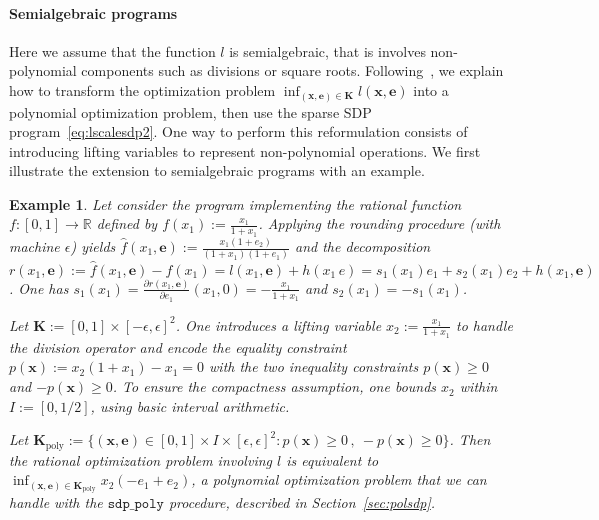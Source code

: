 \documentclass[preprint,fleqn,nocopyrightspace]{sigplanconf}
\newcommand{\R}{\mathbb{R}}
\newcommand{\x}{\mathbf{x}}
\newcommand{\e}{\mathbf{e}}
\def\K{\mathbf{K}}
\newcommand{\Kpol}{\K_{\text{poly}}}
\newcommand{\sdppoly}{\mathtt{sdp\_poly}}
\theoremstyle{plain}
\newtheorem{example}{Example}
\begin{document}
\paragraph{Semialgebraic programs}
Here we assume that the function $l$ is semialgebraic, that is involves non-polynomial components such as divisions or square roots.
Following~\cite{LasPut10}, we explain how to transform the optimization problem $\inf_{(\x,\e) \in \K} l (\x, \e)$ into a polynomial optimization problem, then use the sparse SDP program~\eqref{eq:lscalesdp2}. One way to perform this reformulation consists of introducing lifting variables to represent non-polynomial operations.
%
We first illustrate the extension to semialgebraic programs with an example.
\begin{example}
Let consider the program implementing the rational function $f : [0, 1] \to \R$ defined by $f(x_1) := \frac{x_1}{1 + x_1}$. Applying the rounding procedure (with machine $\epsilon$) yields $\hat{f}(x_1,\e) := \frac{x _1(1 + e_2)}{(1 + x_1)(1 + e_1)}$ and the decomposition $r(x_1, \e) := \hat{f}(x_1,\e) - f(x_1) = l(x_1,\e) + h(x_1\,e) = s_1 (x_1) e_1 + s_2 (x_1) e_2 + h(x_1,\e)$. One has $s_1(x_1) = \frac{\partial r(x_1,\e)} {\partial e_1} (x_1,0) = -\frac{x_1}{1 + x_1}$ and $s_2(x_1) = - s_1(x_1)$.

Let $\K := [0, 1] \times [-\epsilon, \epsilon]^2$. One introduces a lifting variable $x_2 := \frac{x_1}{1 + x_1}$ to handle the division operator and encode the equality constraint $p(\x) :=  x_2 (1 + x_1) - x_1 = 0$ with the two inequality constraints $p (\x) \geq 0$ and $-p(\x) \geq 0$. To ensure the compactness assumption, one bounds $x_2$ within $I := [0, 1/2]$, using basic interval arithmetic.

Let $\Kpol := \{(\x,\e) \in [0, 1] \times I \times [\epsilon, \epsilon]^2 : p(\x) \geq 0 \,,\  - p(\x) \geq 0 \}$. Then the rational optimization problem involving $l$ is equivalent to $\inf_{(\x,\e) \in \Kpol} x_2 (-e_1 + e_2)$, a polynomial optimization problem that we can handle with the $\sdppoly$ procedure, described in Section~\ref{sec:polsdp}.
\end{example}
%
\end{document}
